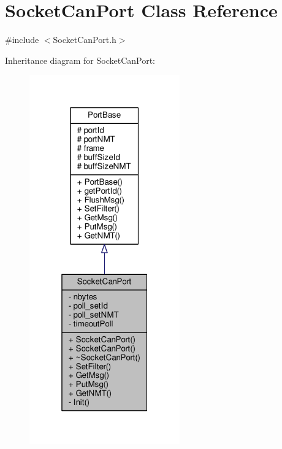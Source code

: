 \hypertarget{classSocketCanPort}{}\section{Socket\+Can\+Port Class Reference}
\label{classSocketCanPort}


{\ttfamily \#include $<$Socket\+Can\+Port.\+h$>$}



Inheritance diagram for Socket\+Can\+Port\+:\nopagebreak
\begin{figure}[H]
\begin{center}
\leavevmode
\includegraphics[width=184pt]{classSocketCanPort__inherit__graph}
\end{center}
\end{figure}


